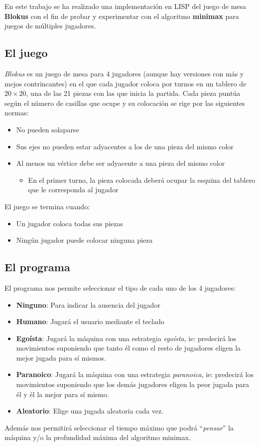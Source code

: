 En este trabajo se ha realizado una implementación en LISP del juego de mesa
\textbf{Blokus} con el fin de probar y experimentar con el algoritmo
\textbf{minimax} para juegos de múltiples jugadores.

\subsection{El juego}
\textsl{Blokus} es un juego de mesa para 4 jugadores (aunque hay versiones con
más y mejos contrincantes) en el que cada jugador coloca por turnos en un
tablero de $20\times20$, una de las 21 piezas con las que inicia la partida.
Cada pieza puntúa según el número de casillas que ocupe y su colocación se rige
por las siguientes normas:

\begin{itemize}
	\item No pueden solaparse
	\item Sus ejes no pueden estar adyacentes a los de una pieza del mismo
		color
	\item Al menos un vértice debe ser adyacente a una pieza del mismo color
	\begin{itemize}
		\item En el primer turno, la pieza colocada deberá ocupar la
			esquina del tablero que le corresponda al jugador
	\end{itemize}
\end{itemize}

El juego se termina cuando:
\begin{itemize}
	\item Un jugador coloca todas sus piezas
	\item Ningún jugador puede colocar ninguna pieza
\end{itemize}

\subsection{El programa}
El programa nos permite seleccionar el tipo de cada uno de los 4 jugadores:
\begin{itemize}
	\item \textbf{Ninguno}: Para indicar la ausencia del jugador
	\item \textbf{Humano}: Jugará el usuario mediante el teclado
	\item \textbf{Egoísta}: Jugará la máquina con una estrategia
		\textsl{egoísta}, ie: predecirá los movimientos suponiendo que
		tanto él como el resto de jugadores eligen la mejor jugada para
		sí mismos.
	\item \textbf{Paranoico}: Jugará la máquina con una estrategia
		\textsl{paranoica}, ie: predecirá los movimientos suponiendo que
		los demás jugadores eligen la peor jugada para él y él la mejor
		para sí mismo.
	\item \textbf{Aleatorio}: Elige una jugada aleatoria cada vez.
\end{itemize}

Además nos permitirá seleccionar el tiempo máximo que podrá ``\textsl{pensar}''
la máquina y/o la profundidad máxima del algoritmo minimax.
